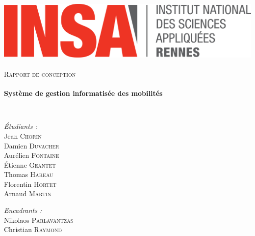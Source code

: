 \begin{titlepage}
        \begin{sffamily}
            \begin{center}

                \includegraphics[width=400pt]{logo_INSA.png}~\\[2.5cm]

                \textsc{\huge Rapport de conception}\\[2.5cm]

                \HRule \\[0.4cm]
                { \huge \bfseries Système de gestion informatisée des mobilités\\[0.4cm] }

                \HRule \\[4cm]

                \begin{minipage}{0.4\textwidth}
                    \begin{flushleft} \large
                        \emph{Étudiants :}\\
                        Jean \textsc{Chorin}\\
                        Damien \textsc{Duvacher}\\
                        Aurélien \textsc{Fontaine}\\
                        Étienne \textsc{Geantet}\\
                        Thomas \textsc{Hareau}\\
                        Florentin \textsc{Hortet}\\
                        Arnaud \textsc{Martin}\\
                    \end{flushleft}
                \end{minipage}
                \begin{minipage}{0.5\textwidth}
                    \begin{flushright} \large
                        \emph{Encadrants :} \\
                        Nikolaos \textsc{Parlavantzas}\\
                        Christian \textsc{Raymond}
                    \end{flushright}
                \end{minipage}


\end{center}
\end{sffamily}
\end{titlepage}
